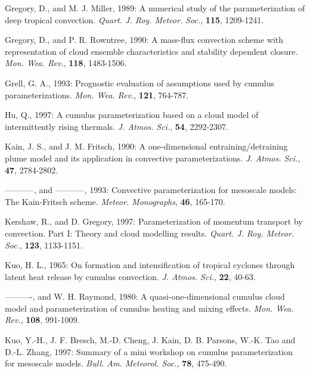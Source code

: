 
\por
Gregory, D., and M. J. Miller, 1989: A numerical study of the parameterization
of deep tropical convection. {\it Quart. J. Roy. Meteor. Soc.},
{\bf 115}, 1209-1241.

\por
Gregory, D., and P. R. Rowntree, 1990:
A mass-flux convection scheme with
representation of cloud ensemble characteristics and stability
dependent closure. {\it Mon. Wea. Rev.}, {\bf 118}, 1483-1506.

\por
Grell, G. A., 1993: Prognostic evaluation of assumptions used by
cumulus parameterizations. {\it Mon. Wea. Rev.}, {\bf 121}, 764-787.

\por
Hu, Q., 1997: A cumulus parameterization based on a cloud model of
intermittently rising thermals. {\it J. Atmos. Sci.}, {\bf 54}, 2292-2307.

\por
Kain, J. S., and J. M. Fritsch, 1990: A one-dimensional
entraining/detraining plume model and its application in
convective parameterizations. {\it J. Atmos. Sci.},
{\bf 47}, 2784-2802.

\por
-----------, and -----------, 1993: Convective parameterization for mesoscale
models: The Kain-Fritsch scheme.
{\it Meteor. Monographs}, {\bf 46}, 165-170.

\por
Kershaw, R., and D. Gregory, 1997: Parameterization of momentum
transport by convection. Part I: Theory and cloud modelling results.
{\it Quart. J. Roy. Meteor. Soc.}, {\bf 123}, 1133-1151.


\por
Kuo, H. L., 1965: On formation and intensification of tropical cyclones
through latent heat release by cumulus convection.
{\it J. Atmos. Sci.}, {\bf 22}, 40-63.

\por
----------, and W. H. Raymond, 1980: A quasi-one-dimensional
cumulus cloud model and parameterization of cumulus heating
and mixing effects. {\it Mon. Wea. Rev.}, {\bf 108}, 991-1009.

\por
Kuo, Y.-H., J. F. Bresch, M.-D. Cheng, J. Kain, D. B. Parsons,
W.-K. Tao and D.-L. Zhang, 1997: Summary of a mini workshop on cumulus
parameterization for mesoscale models.
{\it Bull. Am. Meteorol. Soc.}, {\bf 78}, 475-490.


